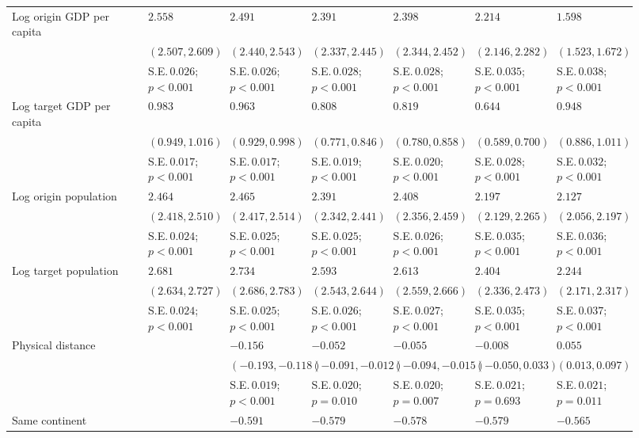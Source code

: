 {\begin{longtable}{p{0.2\linewidth}p{0.12\linewidth}p{0.12\linewidth}p{0.12\linewidth}p{0.12\linewidth}p{0.12\linewidth}p{0.12\linewidth}}
Log origin GDP per capita & $2.558$ & $2.491$ & $2.391$ & $2.398$ & $2.214$ & $1.598$\\ 
 & $(2.507, 2.609)$ & $(2.440, 2.543)$ & $(2.337, 2.445)$ & $(2.344, 2.452)$ & $(2.146, 2.282)$ & $(1.523, 1.672)$\\ 
 & S.E.\,$0.026$; ${p < 0.001}$ & S.E.\,$0.026$; ${p < 0.001}$ & S.E.\,$0.028$; ${p < 0.001}$ & S.E.\,$0.028$; ${p < 0.001}$ & S.E.\,$0.035$; ${p < 0.001}$ & S.E.\,$0.038$; ${p < 0.001}$\\ [0.8ex]  
Log target GDP per capita & $0.983$ & $0.963$ & $0.808$ & $0.819$ & $0.644$ & $0.948$\\ 
 & $(0.949, 1.016)$ & $(0.929, 0.998)$ & $(0.771, 0.846)$ & $(0.780, 0.858)$ & $(0.589, 0.700)$ & $(0.886, 1.011)$\\ 
 & S.E.\,$0.017$; ${p < 0.001}$ & S.E.\,$0.017$; ${p < 0.001}$ & S.E.\,$0.019$; ${p < 0.001}$ & S.E.\,$0.020$; ${p < 0.001}$ & S.E.\,$0.028$; ${p < 0.001}$ & S.E.\,$0.032$; ${p < 0.001}$\\ [0.8ex]  
Log origin population & $2.464$ & $2.465$ & $2.391$ & $2.408$ & $2.197$ & $2.127$\\ 
 & $(2.418, 2.510)$ & $(2.417, 2.514)$ & $(2.342, 2.441)$ & $(2.356, 2.459)$ & $(2.129, 2.265)$ & $(2.056, 2.197)$\\ 
 & S.E.\,$0.024$; ${p < 0.001}$ & S.E.\,$0.025$; ${p < 0.001}$ & S.E.\,$0.025$; ${p < 0.001}$ & S.E.\,$0.026$; ${p < 0.001}$ & S.E.\,$0.035$; ${p < 0.001}$ & S.E.\,$0.036$; ${p < 0.001}$\\ [0.8ex]  
Log target population & $2.681$ & $2.734$ & $2.593$ & $2.613$ & $2.404$ & $2.244$\\ 
 & $(2.634, 2.727)$ & $(2.686, 2.783)$ & $(2.543, 2.644)$ & $(2.559, 2.666)$ & $(2.336, 2.473)$ & $(2.171, 2.317)$\\ 
 & S.E.\,$0.024$; ${p < 0.001}$ & S.E.\,$0.025$; ${p < 0.001}$ & S.E.\,$0.026$; ${p < 0.001}$ & S.E.\,$0.027$; ${p < 0.001}$ & S.E.\,$0.035$; ${p < 0.001}$ & S.E.\,$0.037$; ${p < 0.001}$\\ [0.8ex]  
Physical distance &  & $-0.156$ & $-0.052$ & $-0.055$ & $-0.008$ & $0.055$\\ 
 &  & $(-0.193, -0.118)$ & $(-0.091, -0.012)$ & $(-0.094, -0.015)$ & $(-0.050, 0.033)$ & $(0.013, 0.097)$\\ 
 &  & S.E.\,$0.019$; ${p < 0.001}$ & S.E.\,$0.020$; ${p = 0.010}$ & S.E.\,$0.020$; ${p = 0.007}$ & S.E.\,$0.021$; ${p = 0.693}$ & S.E.\,$0.021$; ${p = 0.011}$\\ [0.8ex]  
Same continent &  & $-0.591$ & $-0.579$ & $-0.578$ & $-0.579$ & $-0.565$\\ 

\end{longtable}}
